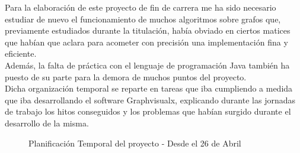 \documentclass[a4paper,12pt]{article}
\begin{document}
Para la elaboración de este proyecto de fin de carrera me ha sido necesario estudiar de nuevo el funcionamiento de muchos algoritmos sobre grafos que, previamente estudiados durante la titulación, había obviado en ciertos matices que habían que aclara para acometer con precisión una implementación fina y eficiente.\\ Además, la falta de práctica con el lenguaje de programación Java también ha puesto de su parte para la demora de muchos puntos del proyecto.\\

Dicha organización temporal se reparte en tareas que iba cumpliendo a medida que iba desarrollando el software Graphvisualx, explicando durante las jornadas de trabajo los hitos conseguidos y los problemas que habían surgido durante el desarrollo de la misma.

\vfill
\pagebreak
\begin{figure}[H]
\caption{Planificación Temporal del proyecto - Desde el 26 de Abril}
\end{figure}
\end{document}

